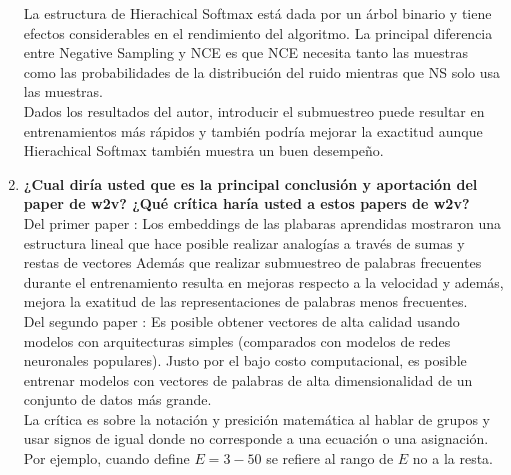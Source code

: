 \documentclass[11pt,letterpaper]{article}
\theoremstyle{definition}
\theoremstyle{definition}
\theoremstyle{definition}
\begin{document}
\begin{enumerate}
	La estructura de Hierachical Softmax está dada por un árbol binario y tiene efectos considerables en el rendimiento del algoritmo. La principal diferencia entre Negative Sampling y NCE es que NCE necesita tanto las muestras como las probabilidades de la distribución del ruido mientras que NS solo usa las muestras. 
	\\
	Dados los resultados del autor, introducir el submuestreo puede resultar en entrenamientos más rápidos y también podría mejorar la exactitud aunque Hierachical Softmax también muestra un buen desempeño.
	\item \textbf{¿Cual diría usted que es la principal conclusión y aportación del paper de w2v? ¿Qué crítica haría usted a estos papers de w2v?}
	\\
	Del primer paper : Los embeddings de las plabaras aprendidas mostraron una estructura lineal que hace posible realizar analogías a través de sumas y restas de vectores Además que realizar submuestreo de palabras frecuentes durante el entrenamiento resulta en mejoras respecto a la velocidad y además, mejora la exatitud de las representaciones de palabras menos frecuentes. 
	\\
	Del segundo paper :	Es posible obtener vectores de alta calidad usando modelos con arquitecturas simples (comparados con modelos de redes neuronales populares). Justo por el bajo costo computacional, es posible entrenar modelos con vectores de palabras de alta dimensionalidad de un conjunto de datos más grande. 	
	\\
	La crítica es sobre la notación y presición matemática al hablar de grupos y usar signos de igual donde no corresponde a una ecuación o una asignación. Por ejemplo, cuando define $ E = 3-50 $ se refiere al rango de $ E $ no a la resta.
\end{enumerate}
\end{document}
